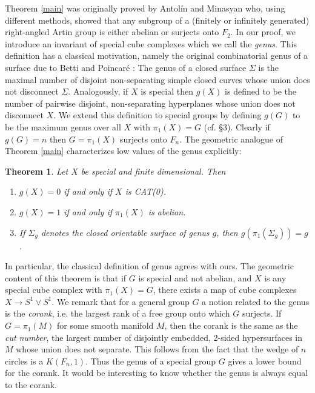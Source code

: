 \documentclass[11pt]{amsart}
\newtheorem{thm}{Theorem}
\numberwithin{thm}{section}
\theoremstyle{remark}
\theoremstyle{definition}
\begin{document}
Theorem \ref{main} was originally proved by Antol\'{i}n and Minasyan \cite{AM15} who, using different methods, showed that any subgroup of a (finitely or infinitely generated) right-angled Artin group is either abelian or surjects onto $F_2$. In our proof, we introduce an invariant of special cube complexes which we call the \emph{genus}.  This definition has a classical motivation, namely the original combinatorial genus of a surface due to Betti and Poincar\'{e} \cite{PoAS}:  The genus of a closed surface $\Sigma$ is the maximal number of disjoint non-separating simple closed curves whose union does not disconnect $\Sigma$.  Analogously, if $X$ is special then $g(X)$ is defined to be the number of pairwise disjoint, non-separating hyperplanes whose union does not disconnect $X$.  We extend this definition to special groups by defining $g(G)$ to be the maximum genus over all $X$ with $\pi_1(X)=G$ (cf. \S 3).  
Clearly if $g(G)=n$ then $G=\pi_1(X)$ surjects onto $F_n$. The geometric analogue of Theorem \ref{main} characterizes low values of the genus explicitly:
\begin{thm} \label{main1}Let $X$ be special and finite dimensional.  Then
\begin{enumerate}
\item $g(X)=0$ if and only if $X$ is CAT(0).
\item $g(X)=1$ if and only if $\pi_1(X)$ is abelian. 
\item If $\Sigma_g$ denotes the closed orientable surface of genus $g$, then $g(\pi_1(\Sigma_g))=g$. 
\end{enumerate}
\end{thm}

In particular, the classical definition of genus agrees with ours.  The geometric content of this theorem is that if $G$ is special and not abelian, and $X$ is any special cube complex with $\pi_1(X)=G$, there exists a map of cube complexes $X\rightarrow S^1\vee S^1$.  We remark that for a  general group $G$ a notion related to the genus is  the \emph{corank}, i.e. the largest rank of a free group onto which $G$ surjects.  If $G=\pi_1(M)$ for some smooth manifold $M$, then the corank is the same as the \emph{cut number}, the largest number of disjointly embedded, 2-sided hypersurfaces in $M$ whose union does not separate.  This follows from the fact that the wedge of $n$ circles is a $K(F_n,1)$.  Thus the genus of a special group $G$ gives a lower bound for the corank.  It would be interesting to know whether the genus is always equal to the corank.
\end{document}
